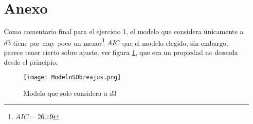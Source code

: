 \documentclass[10.5pt,notitlepage]{article}
\theoremstyle{plain}
\begin{document}
\section{Anexo}

 Como comentario final para el ejercicio 1, el modelo que considera únicamente a \(d3\) tiene por muy poco un menor\footnote{\(AIC = 26.19\)} \(AIC\) que el modelo elegido, sin embargo, parece tener cierto sobre ajuste, ver figura \ref{Sobreajus}, que era un propiedad no deseada desde el principio.
 \begin{figure}
     \centering
     \texttt{[image: ModeloSObreajus.png]}
     \caption{Modelo que solo considera a \(d3\)}
     \label{Sobreajus}
 \end{figure}

\newpage
\nocite{dunn_generalized_2018}
\printbibliography
\end{document}
